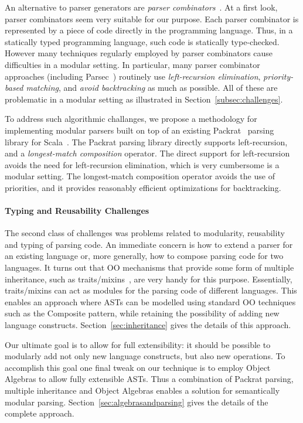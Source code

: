   An alternative to parser generators are \emph{parser
    combinators}~\cite{burge1975,Wadler1985}.  At a first look, parser
  combinators seem very suitable for our purpose. Each parser
  combinator is represented by a piece of code directly in the
  programming language. Thus, in a statically typed programming
  language, such code is statically type-checked.  However many
  techniques regularly employed by parser combinators cause difficulties in a
  modular setting. In particular, many parser combinator approaches
  (including Parsec~\cite{Leijen2001}) routinely use \emph{left-recursion
    elimination}, \emph{priority-based matching}, and \emph{avoid
    backtracking} as much as possible. All of these are problematic in
  a modular setting as illustrated in Section~\ref{subsec:challenges}.

  To address such algorithmic challanges, we propose a methodology
  for implementing modular parsers built on top of an
  existing Packrat~\cite{Ford2002} parsing library for Scala~\cite{}. The Packrat parsing library
  directly supports left-recursion, and a \emph{longest-match
    composition} operator. The direct support for left-recursion
  avoids the need for left-recursion elimination, which is very
  cumbersome is a modular setting. The longest-match composition
  operator avoids the use of priorities, and it provides reasonably
  efficient optimizations for backtracking.

  \paragraph{Typing and Reusability Challenges} The second class of
  challenges was problems related to modularity, reusability and
  typing of parsing code. An immediate concern is how to extend a
  parser for an existing language or, more generally, how to compose
  parsing code for two languages. It turns out that OO mechanisms that
  provide some form of multiple inheritance,
  such as traits/mixins~\cite{scalaoverview}, are very handy for this
  purpose. Essentially, traits/mixins can act as modules for the parsing code
  of different languages. This enables an approach where ASTs can be
  modelled using standard OO techniques such as the {\sc Composite}
  pattern, while retaining the possibility of adding new language
  constructs. Section~\ref{sec:inheritance} gives the details of this approach.

  Our ultimate goal is to allow for full extensibility: it should be
  possible to modularly add not only new language constructs, but
  also new operations. To accomplish this goal one final tweak on our
  technique is to employ Object Algebras to allow fully extensible
  ASTs. Thus a combination of Packrat parsing, multiple inheritance
  and Object Algebras enables a solution for semantically modular
  parsing. Section~\ref{sec:algebrasandparsing} gives the details of the complete approach.


